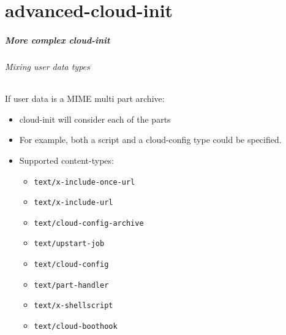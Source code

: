 \part{advanced-cloud-init}


\begin{frame}
  \frametitle{More complex cloud-init}
  \framesubtitle{Mixing user data types}
    
  \begin{block}{If user data is a MIME multi part archive:}
    \begin{itemize}
        \item cloud-init will consider each of the parts
        \item For example, both a script and a cloud-config type could be specified.
        \item Supported content-types:
        \begin{itemize}
            \item \texttt{text/x-include-once-url}
            \item \texttt{text/x-include-url}
            \item \texttt{text/cloud-config-archive}
            \item \texttt{text/upstart-job}
            \item \texttt{text/cloud-config}
            \item \texttt{text/part-handler}
            \item \texttt{text/x-shellscript}
            \item \texttt{text/cloud-boothook}
        \end{itemize}
    \end{itemize}
  \end{block}
\end{frame}


